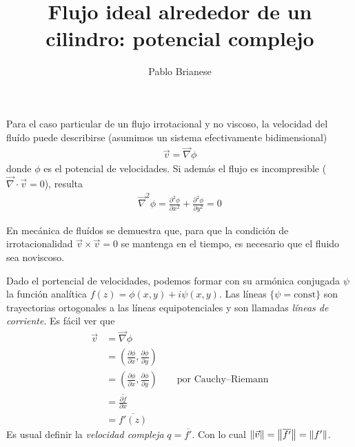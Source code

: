 \documentclass{article}
\title{Flujo ideal alrededor de un cilindro: potencial complejo}
\author{Pablo Brianese}
\DeclarePairedDelimiter{\norm}{\lVert}{\rVert}
\theoremstyle{remark}
\begin{document}
  \maketitle
  Para el caso particular de un flujo irrotacional y no viscoso, la velocidad del fluído puede describirse (asumimos un sistema efectivamente bidimensional)
  \begin{align}
    \vec{v} = \vec{\nabla} \phi
  \end{align}
  donde \(\phi\) es el potencial de velocidades.
  Si además el flujo es incompresible (\(\vec{\nabla} \cdot \vec{v} = 0\)), resulta
  \begin{align}
    \vec{\nabla}^2 \phi
    =
    \frac{\partial^2 \phi}{\partial x^2}
    +
    \frac{\partial^2 \phi}{\partial y^2}
    =
    0
  \end{align}

  En mecánica de fluídos se demuestra que, para que la condición de irrotacionalidad \(\vec{v} \times \vec{v} = 0\) se mantenga en el tiempo, es necesario que el fluido sea noviscoso.

  Dado el portencial de velocidades, podemos formar con su armónica conjugada \(\psi\) la función analítica \(f(z) = \phi(x, y) + i \psi(x, y)\).
  Las líneas \(\{\psi = \text{const}\}\) son trayectorias ortogonales a las líneas equipotenciales y son llamadas \emph{líneas de corriente}.
  Es fácil ver que
  \begin{align}
    \vec{v}
    &=
    \vec{\nabla} \phi
    \\
    &=
    \left( \frac{\partial \phi}{\partial x}, \frac{\partial \phi}{\partial y} \right)
    \\
    &=
    \left( \frac{\partial \phi}{\partial x}, \frac{\partial \phi}{\partial y} \right)
    \qquad
    \text{por Cauchy--Riemann}
    \\
    &=
    \overline{\frac{\partial f}{\partial x}}
    \\
    &=
    \overline{f'(z)}
  \end{align}
  Es usual definir la \emph{velocidad compleja} \(q = \overline{f'}\).
  Con lo cual \(\norm{\vec{v}} = \norm*{\overline{f'}} = \norm{f'}\).
\end{document}
